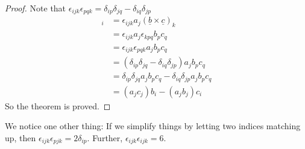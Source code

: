 \begin{proof}
    Note that $\epsilon_{ijk}\epsilon_{pqk}=\delta_{ip}\delta_{jq}-\delta_{iq}\delta_{jp}$
    \begin{align*}
        [\underline{a}\times(\underline{b}\times\underline{c})]_i
        &=\epsilon_{ijk}a_j(\underline{b}\times\underline{c})_k\\
        &=\epsilon_{ijk}a_j\epsilon_{kpq}b_pc_q\\
        &=\epsilon_{ijk}\epsilon_{pqk}a_jb_pc_q\\
        &=(\delta_{ip}\delta_{jq}-\delta_{iq}\delta_{jp})a_jb_pc_q\\
        &=\delta_{ip}\delta_{jq}a_jb_pc_q-\delta_{iq}\delta_{jp}a_jb_pc_q\\
        &=(a_jc_j)b_i-(a_jb_j)c_i
    \end{align*}
    So the theorem is proved.
\end{proof}
We notice one other thing:
If we simplify things by letting two indices matching up,  then $\epsilon_{ijk}\epsilon_{pjk}=2\delta_{ip}$.
Further, $\epsilon_{ijk}\epsilon_{ijk}=6$.